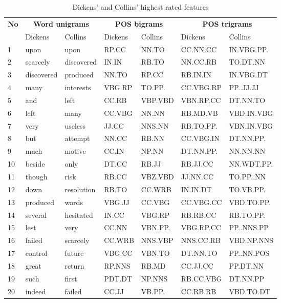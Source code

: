 \documentclass[a4paper,10pt,twoside,fleqn]{article}
\begin{document}
\begin{table}[h!]
\small
\label{tab:results-features-dc}
\caption{Dickens' and Collins' highest rated features }
\begin{tabular}{lllllll}\toprule[1.2pt]
 \multicolumn{1}{c}{\textbf{No}} & \multicolumn{2}{c}{\textbf{Word unigrams}}&  
 \multicolumn{2}{c}{\textbf{POS bigrams}} & \multicolumn{2}{c}{\textbf{POS trigrams}}\\
 \cmidrule(r){1-1} 
 \cmidrule(r){2-3} 
\cmidrule(r){4-5} 
 \cmidrule(r){6-7}
    & Dickens	  &  Collins    & Dickens&  Collins& Dickens	  &  Collins   \\\midrule
1   &       upon  &       upon  &  RP.CC  &   NN.TO  &  CC.NN.CC   & IN.VBG.PP. \\
2   &   scarcely  & discovered  &  IN.IN  &   RB.TO  &  NN.CC.RB   &   TO.DT.NN  \\
3   & discovered  &   produced  &  NN.TO  &   RP.CC  &  RB.IN.IN   &  IN.VBG.DT \\
4   &       many  &  interests  & VBG.RP  &  TO.PP.  & CC.VBG.RP   &  PP..JJ.JJ \\
5   &        and  &       left  &  CC.RB  & VBP.VBD  & VBN.RP.CC   &   DT.NN.TO \\
6   &       left  &       many  & CC.VBG  &   NN.NN  &  RB.MD.VB   & VBD.IN.VBG \\
7   &       very  &    useless  &  JJ.CC  &  NNS.NN  & RB.TO.PP.   & VBN.IN.VBG \\
8   &        but  &    attempt  &  NN.CC  &   RB.NN  & CC.VBG.IN   &  DT.NN.PP. \\
9   &       much  &     motive  &  CC.IN  &   NP.NN  & DT.NN.PP.   &   NN.NN.NN \\
10  &     beside  &       only  &  DT.CC  &   RB.JJ  &  RB.JJ.CC   & NN.WDT.PP. \\
11  &     though  &       risk  &  RB.CC  & VBZ.VBD  &  JJ.NN.CC   &  TO.PP..NN \\
12  &       down  & resolution  &  RB.TO  &  CC.WRB  &  IN.IN.DT   &  TO.VB.PP. \\
13  &   produced  &      words  & VBG.JJ  &  CC.VBG  & CC.VBG.CC   & VBD.TO.PP. \\
14  &    several  &  hesitated  &  IN.CC  &  VBG.RP  &  RB.RB.CC   &  RB.TO.PP. \\
15  &       lest  &       very  &  CC.NN  & VBN.PP.  & VBG.RP.CC   & PP..NNS.PP \\
16  &     failed  &   scarcely  & CC.WRB  & NNS.VBP  & NNS.CC.RB   & VBD.NP.NNS \\
17  &    control  &     future  & VBG.CC  &  VBN.TO  &  DT.NN.TO   & PP..NN.POS \\
18  &      great  &     return  & RP.NNS  &   RB.MD  &  CC.JJ.CC   &   PP.DT.NN \\
19  &       such  &      first  & PDT.DT  &  NP.NNS  & RB.CC.VBG   &   DT.NN.PP \\
20  &     indeed  &     failed  &  CC.JJ  &  VB.PP.  &  CC.RB.RB   &  VBD.TO.DT \\
\bottomrule
\end{tabular}
\end{table}
\end{document}
